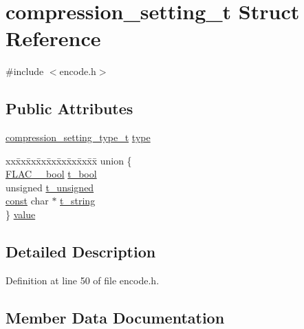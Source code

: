 \hypertarget{structcompression__setting__t}{}\section{compression\+\_\+setting\+\_\+t Struct Reference}
\label{structcompression__setting__t}


{\ttfamily \#include $<$encode.\+h$>$}

\subsection*{Public Attributes}
\begin{DoxyCompactItemize}
\item 
\hyperlink{libflac_2src_2flac_2encode_8h_af2c0e53174ce8c1f7cd13d337db827ba}{compression\+\_\+setting\+\_\+type\+\_\+t} \hyperlink{structcompression__setting__t_a1d26b54168b8faf8a640495f85551338}{type}
\item 
\begin{tabbing}
xx\=xx\=xx\=xx\=xx\=xx\=xx\=xx\=xx\=\kill
union \{\\
\>\hyperlink{ordinals_8h_a95103469f1cbd78b8cf250194985b34e}{FLAC\_\_bool} \hyperlink{structcompression__setting__t_adf8495e4c63bd645c35e820ac496d579}{t\_bool}\\
\>unsigned \hyperlink{structcompression__setting__t_aaf46a77bd6258b71af75d875548d94e1}{t\_unsigned}\\
\>\hyperlink{getopt1_8c_a2c212835823e3c54a8ab6d95c652660e}{const} char $\ast$ \hyperlink{structcompression__setting__t_a91e1d54af8d9e89ea451148d2b0b2840}{t\_string}\\
\} \hyperlink{structcompression__setting__t_a3b4cc2b4e534dfbfc9d0a59c13510c22}{value}\\

\end{tabbing}\end{DoxyCompactItemize}


\subsection{Detailed Description}


Definition at line 50 of file encode.\+h.



\subsection{Member Data Documentation}
